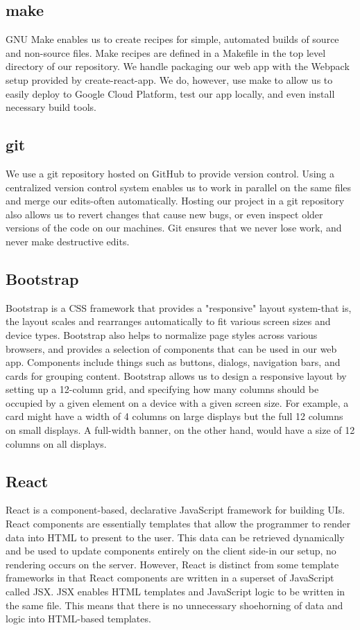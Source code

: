 \documentclass{scrartcl}
\begin{document}
    \subsection{make}\label{subsec:make}
    GNU Make enables us to create recipes for simple, automated builds of source and non-source files.
    Make recipes are defined in a Makefile in the top level directory of our repository.
    We handle packaging our web app with the Webpack setup provided by create-react-app.
    We do, however, use make to allow us to easily deploy to Google Cloud Platform, test our app locally, and even install necessary build tools.

    \subsection{git}\label{subsec:git}
    We use a git repository hosted on GitHub to provide version control.
    Using a centralized version control system enables us to work in parallel on the same files and merge our edits-often automatically.
    Hosting our project in a git repository also allows us to revert changes that cause new bugs, or even inspect older versions of the code on our machines.
    Git ensures that we never lose work, and never make destructive edits.

    \subsection{Bootstrap}\label{subsec:bootstrap}
    Bootstrap is a CSS framework that provides a "responsive" layout system-that is, the layout scales and rearranges automatically to fit various screen sizes and device types.
    Bootstrap also helps to normalize page styles across various browsers, and provides a selection of components that can be used in our web app.
    Components include things such as buttons, dialogs, navigation bars, and cards for grouping content.
    Bootstrap allows us to design a responsive layout by setting up a 12-column grid, and specifying how many columns should be occupied by a given element on a device with a given screen size.
    For example, a card might have a width of 4 columns on large displays but the full 12 columns on small displays.
    A full-width banner, on the other hand, would have a size of 12 columns on all displays.

    \subsection{React}\label{subsec:react}
    React is a component-based, declarative JavaScript framework for building UIs.
    React components are essentially templates that allow the programmer to render data into HTML to present to the user.
    This data can be retrieved dynamically and be used to update components entirely on the client side-in our setup, no rendering occurs on the server.
    However, React is distinct from some template frameworks in that React components are written in a superset of JavaScript called JSX.
    JSX enables HTML templates and JavaScript logic to be written in the same file.
    This means that there is no unnecessary shoehorning of data and logic into HTML-based templates.
\end{document}
